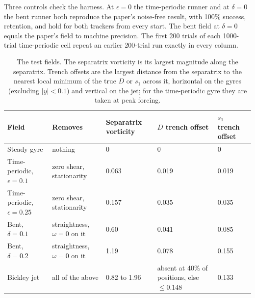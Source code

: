 \documentclass[11pt]{article}
\begin{document}
Three controls check the harness. At $\epsilon = 0$ the time-periodic
runner and at $\delta = 0$ the bent runner both reproduce the paper's
noise-free result, with 100\% success, retention, and hold for both
trackers from every start. The bent field at $\delta = 0$ equals the
paper's field to machine precision. The first 200 trials of each 1000-trial
time-periodic cell repeat an earlier 200-trial run exactly in every
column.

\begin{table}[t]
\centering
\caption{The test fields. The separatrix vorticity is its largest
magnitude along the separatrix. Trench offsets are the largest distance
from the separatrix to the nearest local minimum of the true $D$ or $s_1$
across it, horizontal on the gyres (excluding $|y| < 0.1$) and vertical on
the jet; for the time-periodic gyre they are taken at peak forcing.}
\label{tab:fields}
\small
\begin{tabular}{p{}p{}p{}p{}p{}}
\toprule
Field & Removes & Separatrix vorticity & $D$ trench offset & $s_1$ trench offset \\
\midrule
Steady gyre                 & nothing                       & 0          & 0     & 0     \\
Time-periodic, $\epsilon=0.1$  & zero shear, stationarity   & 0.063      & 0.019 & 0.019 \\
Time-periodic, $\epsilon=0.25$ & zero shear, stationarity   & 0.157      & 0.035 & 0.035 \\
Bent, $\delta=0.1$           & straightness, $\omega = 0$ on it & 0.60    & 0.041 & 0.085 \\
Bent, $\delta=0.2$           & straightness, $\omega = 0$ on it & 1.19    & 0.078 & 0.155 \\
Bickley jet                  & all of the above             & 0.82 to 1.96 & absent at 40\% of positions, else $\le 0.148$ & 0.133 \\
\bottomrule
\end{tabular}
\end{table}
\end{document}
